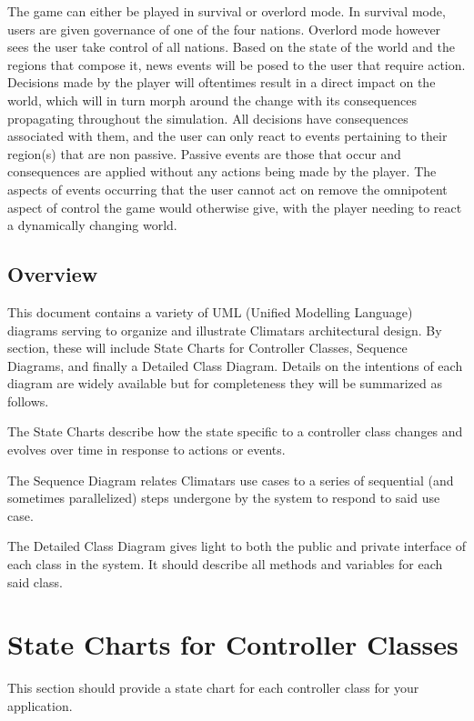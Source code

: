 \documentclass[]{article}
\begin{document}
\vspace{5mm}
\noindent
The game can either be played in survival or overlord mode. In
survival mode, users are given governance of one of the four nations.
Overlord mode however sees the user take control of all nations. Based
on the state of the world and the regions that compose it, news events
will be posed to the user that require action. Decisions made by the
player will oftentimes result in a direct impact on the world, which
will in turn morph around the change with its consequences propagating
throughout the simulation. All decisions have consequences associated
with them, and the user can only react to events pertaining to their
region(s) that are non passive. Passive events are those that occur
and consequences are applied without any actions being made by the
player. The aspects of events occurring that the user cannot act on
remove the omnipotent aspect of control the game would otherwise give,
with the player needing to react a dynamically changing world.

\subsection{Overview}
\label{sub:overview}
This document contains a variety of UML (Unified Modelling Language)
diagrams serving to organize and illustrate Climatars architectural
design. By section, these will include State Charts for Controller
Classes, Sequence Diagrams, and finally a Detailed Class
Diagram. Details on the intentions of each diagram are widely
available but for completeness they will be summarized as follows.

\vspace{5mm}
\noindent
The State Charts describe how the state specific to a controller class
changes and evolves over time in response to actions or events.

\vspace{5mm}
\noindent
The Sequence Diagram relates Climatars use cases to a series of sequential
(and sometimes parallelized) steps undergone by the system to respond to 
said use case.

\vspace{5mm}
\noindent
The Detailed Class Diagram gives light to both the public and private
interface of each class in the system. It should describe all methods
and variables for each said class.


\section{State Charts for Controller Classes}
\label{sec:state_charts_for_controller_classes}
This section should provide a state chart for each controller class for your application.
\end{document}
